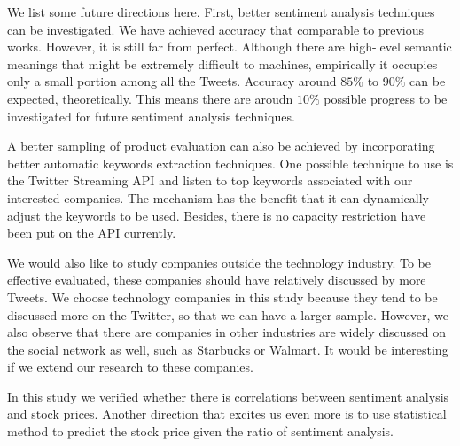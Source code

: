 \documentclass[12pt]{article}
\begin{document}
We list some future directions here. First, better sentiment analysis techniques can be investigated. We have achieved accuracy that comparable to previous works. However, it is still far from perfect. Although there are high-level semantic meanings that might be extremely difficult to machines, empirically it occupies only a small portion among all the Tweets. Accuracy around $85\%$ to $90\%$ can be expected, theoretically. This means there are aroudn $10\%$ possible progress to be investigated for future sentiment analysis techniques.

A better sampling of product evaluation can also be achieved by incorporating better automatic keywords extraction techniques. One possible technique to use is the Twitter Streaming API \cite{TwtStrAPI} and listen to top keywords associated with our interested companies. The mechanism has the benefit that it can dynamically adjust the keywords to be used. Besides, there is no capacity restriction have been put on the API currently.

We would also like to study companies outside the technology industry. To be effective evaluated, these companies should have relatively discussed by more Tweets. We choose technology companies in this study because they tend to be discussed more on the Twitter, so that we can have a larger sample. However, we also observe that there are companies in other industries are widely discussed on the social network as well, such as Starbucks or Walmart. It would be interesting if we extend our research to these companies.

In this study we verified whether there is correlations between sentiment analysis and stock prices. Another direction that excites us even more is to use statistical method to predict the stock price given the ratio of sentiment analysis.



\end{document}
